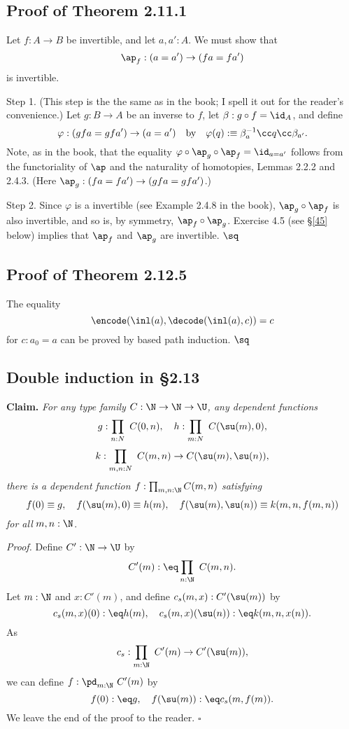 \documentclass[12pt]{article}
\begin{document}

\subsection{Proof of Theorem 2.11.1}\label{2111}

Let $f:A\to B$ be invertible, and let $a,a':A$. We must show that 
$$
\ap_f:(a=a')\to (fa=fa')
$$ 
is invertible.

Step 1. (This step is the the same as in the book; I spell it out for the reader's convenience.) Let $g:B\to A$ be an inverse to $f$, let $\beta:g\circ f=\id_A$, and define 
$$
\varphi:(gfa=gfa')\to(a=a')\quad\text{by}\quad\varphi(q):\equiv\beta_a^{-1}\cc q\cc\beta_{a'}.
$$ 
Note, as in the book, that the equality $\varphi\circ\ap_g\circ\ap_f=\id_{a=a'}$ follows from the functoriality of $\ap$ and the naturality of homotopies, Lemmas 2.2.2 and 2.4.3. (Here $\ap_g:(fa=fa')\to (gfa=gfa')$.)

Step 2. Since $\varphi$ is a invertible (see Example 2.4.8 in the book), $\ap_g\circ\ap_f$ is also invertible, and so is, by symmetry, $\ap_f\circ\ap_g$. Exercise 4.5 (see \S\ref{45} below) implies that $\ap_f$ and $\ap_g$ are invertible. $\sq$


\subsection{Proof of Theorem 2.12.5}

The equality 
$$
\encode(\inl(a),\decode(\inl(a),c))=c
$$ 
for $c:a_0=a$ can be proved by based path induction. $\sq$



\subsection{Double induction in \S2.13}

\nn\textbf{Claim.} \emph{For any type family $C:\N\to\N\to\U$, any dependent functions}
$$
g:\prod_{n:N}\ C(0,n),\quad h:\prod_{m:N}\ C(\su(m),0),
$$
$$
k:\prod_{m,n:N}\ C(m,n)\to C(\su(m),\su(n)),
$$ 
\emph{there is a dependent function $f:\prod_{m,n:\N}C(m,n)$ satisfying}
$$
f(0)\equiv g,\quad f(\su(m),0)\equiv h(m),\quad f(\su(m),\su(n))\equiv k(m,n,f(m,n))
$$ 
\emph{for all} $m,n:\N$.

\nn\emph{Proof.} Define $C':\N\to\U$ by 
$$
C'(m):\eq\prod_{n:\N}\ C(m,n).
$$ 
Let $m:\N$ and $x:C'(m)$, and define $c_s(m,x):C'(\su(m))$ by 
$$
c_s(m,x)(0):\eq h(m),\quad c_s(m,x)(\su(n)):\eq k(m,n,x(n)).
$$ 
As  
$$
c_s:\prod_{m:\N}\ C'(m)\to C'(\su(m)),
$$ 
we can define $f:\pd_{m:\N}\ C'(m)$ by 
$$
f(0):\eq g,\quad f(\su(m)):\eq c_s(m,f(m)).
$$ 
We leave the end of the proof to the reader. $\square$
\end{document}

